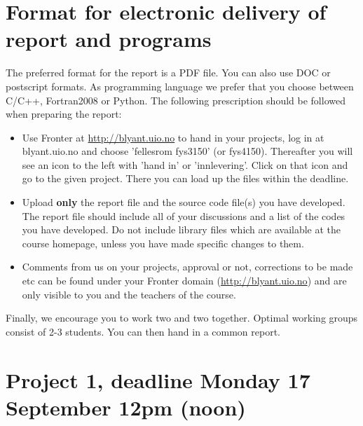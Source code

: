 \documentclass[11pt,a4wide]{article}
\begin{document}
\section*{Format for electronic delivery of report and programs}
%
The preferred format for the report is a PDF file. You can also
use DOC or postscript formats. 
As programming language we prefer that you choose between C/C++, Fortran2008 or Python.
The following prescription should be followed when preparing the report:
\begin{itemize}
\item Use Fronter at \url{http://blyant.uio.no} to hand in your projects, log in  at 
blyant.uio.no and choose 'fellesrom fys3150' (or fys4150).
Thereafter you will see an icon to the left with 'hand in' or 'innlevering'.
Click on that icon and go to the given project. 
There you can load up the files within the deadline. 
\item Upload {\bf only} the report file and the source code file(s) you have developed.
The report file should include all of your discussions and a list of the codes you have developed. 
Do not include library files which are available at the course homepage, unless you have
made specific changes to them.
\item Comments  from us on your projects, approval or not, corrections to be made 
etc can be found under
your Fronter domain (\url{http://blyant.uio.no}) and are only visible to you and the teachers of the course.
 
\end{itemize}
Finally, 
we encourage you to work two and two together. Optimal working groups consist of 
2-3 students. You can then hand in a common report. 

\section*{Project 1, deadline Monday 17 September 12pm (noon)}
\end{document}
